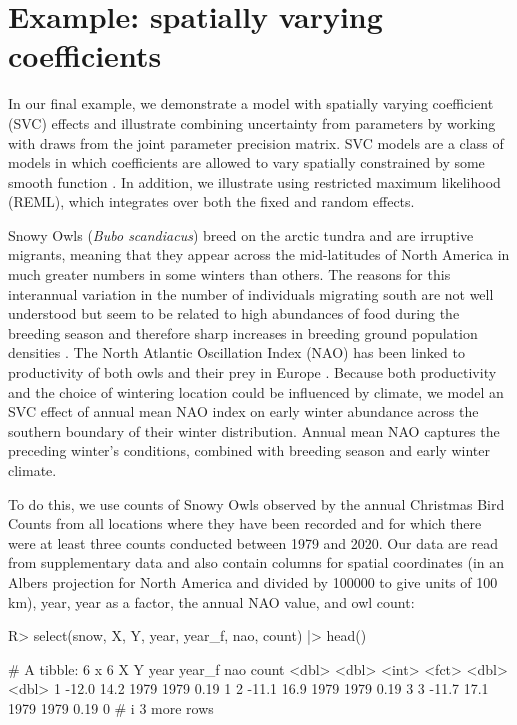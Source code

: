 \documentclass[article]{jss}\usepackage[]{graphicx}\usepackage[dvipsnames]{xcolor}
\begin{document}
\clearpage

\section{Example: spatially varying coefficients} \label{svc-owls}

In our final example, we demonstrate a model with spatially varying coefficient (SVC) effects and illustrate combining uncertainty from parameters by working with draws from the joint parameter precision matrix.
SVC models are a class of models in which coefficients are allowed to vary spatially constrained by some smooth function \citep{hastie1993, thorson2023SVC}.
In addition, we illustrate using restricted maximum likelihood (REML), which integrates over both the fixed and random effects.

Snowy Owls (\emph{Bubo scandiacus}) breed on the arctic tundra and are irruptive migrants, meaning that they appear across the mid-latitudes of North America in much greater numbers in some winters than others.
The reasons for this interannual variation in the number of individuals migrating south are not well understood but seem to be related to high abundances of food during the breeding season and therefore sharp increases in breeding ground population densities \citep{robillard2016}.
The North Atlantic Oscillation Index (NAO) has been linked to productivity of both owls and their prey in Europe \citep{millon2014}.
Because both productivity and the choice of wintering location could be influenced by climate, we model an SVC effect of annual mean NAO index on early winter abundance across the southern boundary of their winter distribution.
Annual mean NAO captures the preceding winter's conditions, combined with breeding season and early winter climate.

To do this, we use counts of Snowy Owls observed by the annual Christmas Bird Counts \citep{cbc} from all locations where they have been recorded and for which there were at least three counts conducted between 1979 and 2020.
Our data are read from supplementary data and also contain columns for spatial coordinates (in an Albers projection for North America and divided by 100000 to give units of 100 km), year, year as a factor, the annual NAO value, and owl count:



\begin{Schunk}
\begin{Sinput}
R> select(snow, X, Y, year, year_f, nao, count) |> head()
\end{Sinput}
\begin{Soutput}
# A tibble: 6 x 6
      X     Y  year year_f   nao count
  <dbl> <dbl> <int> <fct>  <dbl> <dbl>
1 -12.0  14.2  1979 1979    0.19     1
2 -11.1  16.9  1979 1979    0.19     3
3 -11.7  17.1  1979 1979    0.19     0
# i 3 more rows
\end{Soutput}
\end{Schunk}
\end{document}
